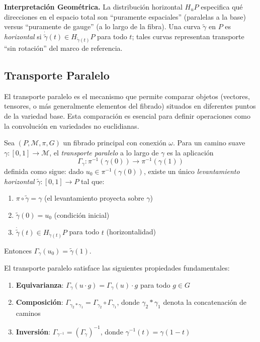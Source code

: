 \textbf{Interpretación Geométrica.} La distribución horizontal $H_u P$ especifica qué direcciones en el espacio total son ``puramente espaciales'' (paralelas a la base) versus ``puramente de gauge'' (a lo largo de la fibra). Una curva $\tilde{\gamma}$ en $P$ es \textit{horizontal} si $\dot{\tilde{\gamma}}(t) \in H_{\tilde{\gamma}(t)} P$ para todo $t$; tales curvas representan transporte ``sin rotación'' del marco de referencia.

\subsection{Transporte Paralelo}\label{subsec:transporte_paralelo_gdl}

El transporte paralelo es el mecanismo que permite comparar objetos (vectores, tensores, o más generalmente elementos del fibrado) situados en diferentes puntos de la variedad base. Esta comparación es esencial para definir operaciones como la convolución en variedades no euclidianas.

\begin{definition}\label{def:transporte_paralelo_formal}
Sea $(P, \mathcal{M}, \pi, G)$ un fibrado principal con conexión $\omega$. Para un camino suave $\gamma: [0,1] \to \mathcal{M}$, el \textit{transporte paralelo} a lo largo de $\gamma$ es la aplicación
\[
\Gamma_\gamma: \pi^{-1}(\gamma(0)) \to \pi^{-1}(\gamma(1))
\]
definida como sigue: dado $u_0 \in \pi^{-1}(\gamma(0))$, existe un único \textit{levantamiento horizontal} $\tilde{\gamma}: [0,1] \to P$ tal que:
\begin{enumerate}
    \item $\pi \circ \tilde{\gamma} = \gamma$ (el levantamiento proyecta sobre $\gamma$)
    \item $\tilde{\gamma}(0) = u_0$ (condición inicial)
    \item $\dot{\tilde{\gamma}}(t) \in H_{\tilde{\gamma}(t)} P$ para todo $t$ (horizontalidad)
\end{enumerate}
Entonces $\Gamma_\gamma(u_0) = \tilde{\gamma}(1)$.
\end{definition}

\begin{theorem}\label{thm:propiedades_transporte}
El transporte paralelo satisface las siguientes propiedades fundamentales:
\begin{enumerate}
    \item \textbf{Equivarianza}: $\Gamma_\gamma(u \cdot g) = \Gamma_\gamma(u) \cdot g$ para todo $g \in G$
    \item \textbf{Composición}: $\Gamma_{\gamma_2 * \gamma_1} = \Gamma_{\gamma_2} \circ \Gamma_{\gamma_1}$, donde $\gamma_2 * \gamma_1$ denota la concatenación de caminos
    \item \textbf{Inversión}: $\Gamma_{\gamma^{-1}} = (\Gamma_\gamma)^{-1}$, donde $\gamma^{-1}(t) = \gamma(1-t)$
\end{enumerate}
\end{theorem}

